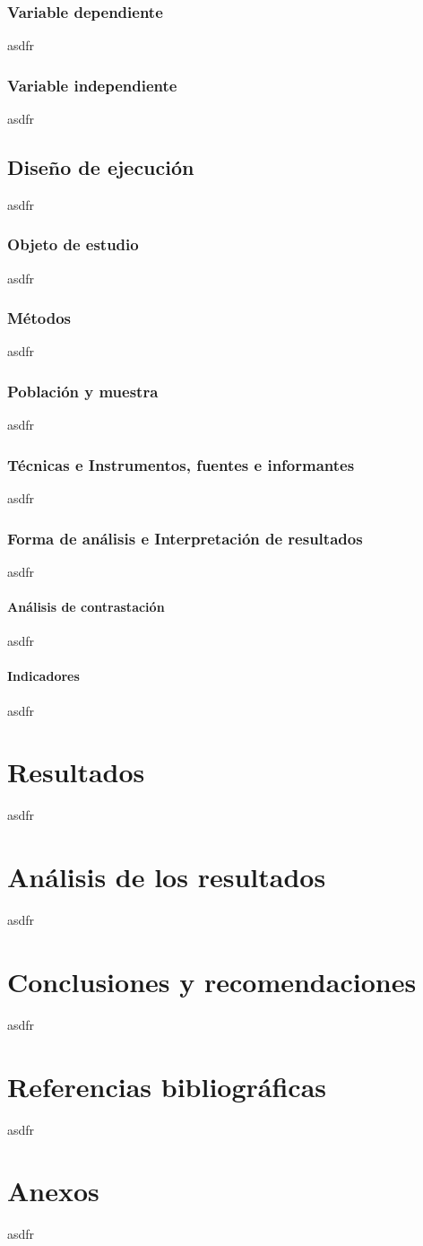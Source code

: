 \documentclass{report}
\begin{document}
\subsection{Variable dependiente}
asdfr
\subsection{Variable independiente}
asdfr
\section{Diseño de ejecución}
asdfr
\subsection{Objeto de estudio}
asdfr
\subsection{Métodos}
asdfr
\subsection{Población y muestra}
asdfr
\subsection{Técnicas e Instrumentos, fuentes e informantes}
asdfr
\subsection{Forma de análisis e Interpretación de resultados}
asdfr
\subsubsection{Análisis de contrastación}
asdfr
\subsubsection{Indicadores}
asdfr
\chapter{Resultados}
asdfr
\chapter{Análisis de los resultados}
asdfr
\chapter{Conclusiones y recomendaciones}
asdfr
\chapter{Referencias bibliográficas}
asdfr
\chapter{Anexos}
asdfr
\end{document}
